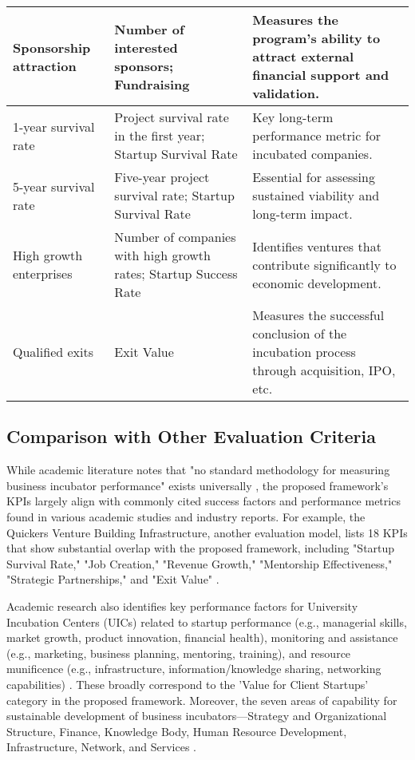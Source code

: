 \documentclass[../Main.tex]{subfiles}
\begin{document}
\begin{longtable}{|p{}|p{}|p{}|}
    \hline
    Sponsorship attraction & Number of interested sponsors; Fundraising & Measures the program's ability to attract external financial support and validation. \\
    \hline
    1-year survival rate & Project survival rate in the first year; Startup Survival Rate & Key long-term performance metric for incubated companies. \\
    \hline
    5-year survival rate & Five-year project survival rate; Startup Survival Rate & Essential for assessing sustained viability and long-term impact. \\
    \hline
    High growth enterprises & Number of companies with high growth rates; Startup Success Rate & Identifies ventures that contribute significantly to economic development. \\
    \hline
    Qualified exits & Exit Value & Measures the successful conclusion of the incubation process through acquisition, IPO, etc. \\
    \hline
\end{longtable}

\subsection{Comparison with Other Evaluation Criteria}
While academic literature notes that "no standard methodology for measuring business incubator performance" exists universally \cite{UBI_KeyFactors}, the proposed framework's KPIs largely align with commonly cited success factors and performance metrics found in various academic studies and industry reports. For example, the Quickers Venture Building Infrastructure, another evaluation model, lists 18 KPIs that show substantial overlap with the proposed framework, including "Startup Survival Rate," "Job Creation," "Revenue Growth," "Mentorship Effectiveness," "Strategic Partnerships," and "Exit Value" \cite{QuickersVenture_IncubatorKPI}.

Academic research also identifies key performance factors for University Incubation Centers (UICs) related to startup performance (e.g., managerial skills, market growth, product innovation, financial health), monitoring and assistance (e.g., marketing, business planning, mentoring, training), and resource munificence (e.g., infrastructure, information/knowledge sharing, networking capabilities) \cite{Kulkarni2024University}. These broadly correspond to the 'Value for Client Startups' category in the proposed framework. Moreover, the seven areas of capability for sustainable development of business incubators—Strategy and Organizational Structure, Finance, Knowledge Body, Human Resource Development, Infrastructure, Network, and Services \cite{Gerdsri2021Capability}.
\end{document}
